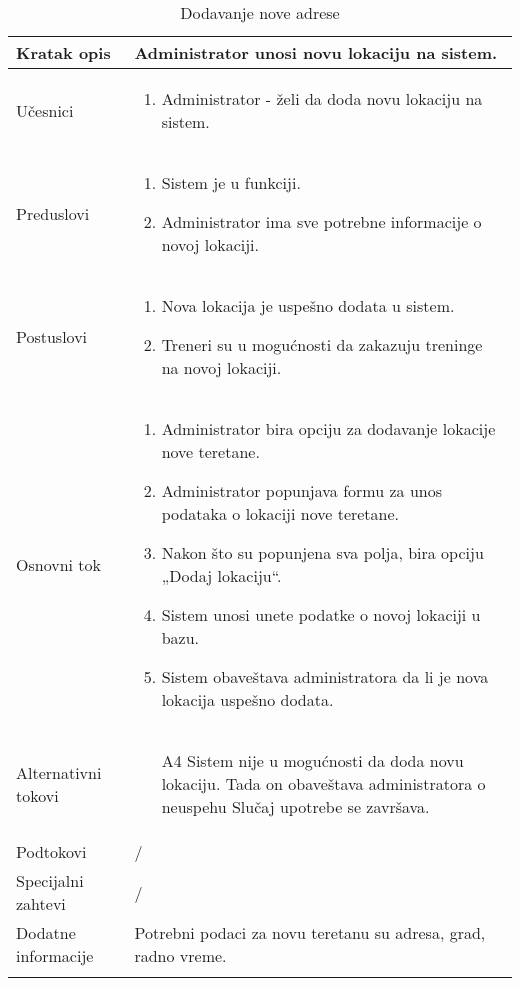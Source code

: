 \documentclass[../main.tex]{subfiles}
\begin{document}
\begin{longtable}{| p{} | p{} |} 

\hline
    Kratak opis &  Administrator unosi novu lokaciju na sistem.\\ 
\hline    
    Učesnici & 
    	\begin{enumerate}
        \item Administrator - želi da doda novu lokaciju na sistem.
     \end{enumerate}\\
\hline
   Preduslovi & \begin{enumerate}
       \item Sistem je u funkciji.
       \item Administrator ima sve potrebne informacije o novoj lokaciji.
   \end{enumerate}\\
\hline  
    Postuslovi & \begin{enumerate}
        \item Nova lokacija je uspešno dodata u sistem.
        \item Treneri su u mogućnosti da zakazuju treninge na novoj lokaciji.
    \end{enumerate}\\
\hline
    Osnovni tok & \begin{enumerate}
        \item Administrator bira opciju za dodavanje lokacije nove teretane.
        \item Administrator popunjava formu za unos podataka o lokaciji nove teretane.
        \item Nakon što su popunjena sva polja, bira opciju „Dodaj lokaciju“.
        \item Sistem unosi unete podatke o novoj lokaciji u bazu.
        \item Sistem obaveštava administratora da li je nova lokacija uspešno dodata.
    \end{enumerate}\\
\hline
    Alternativni tokovi & \begin{itemize}
        \item[A4]  Sistem nije u mogućnosti da doda novu lokaciju. Tada on obaveštava administratora o neuspehu Slučaj upotrebe se završava.

    \end{itemize}\\
\hline
    Podtokovi & /\\
\hline
    Specijalni zahtevi & /\\
\hline
    Dodatne informacije & Potrebni podaci za novu teretanu su adresa, grad, radno vreme.\\
\hline
\caption{Dodavanje nove adrese} %
\end{longtable}
\end{document}
